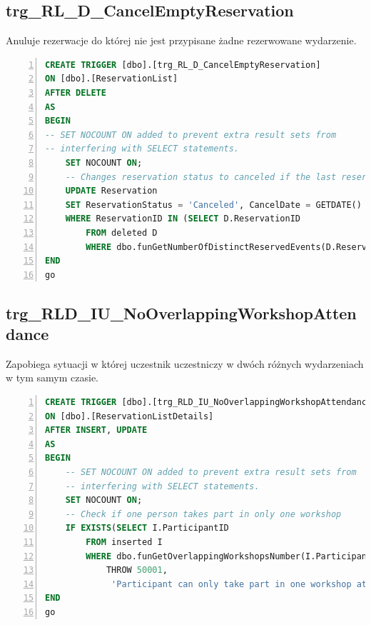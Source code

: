 \documentclass[]{article}
\begin{document}
	\subsection{trg\_RL\_D\_CancelEmptyReservation}
	Anuluje rezerwacje do której nie jest przypisane żadne rezerwowane wydarzenie.
\begin{lstlisting}[language=SQL,
showspaces=false,
basicstyle=\ttfamily,
numbers=left,
numberstyle=\tiny,
tabsize=2,
backgroundcolor=\color{lightg},
keywordstyle=\color{lightblue},
commentstyle=\color{gray}]
CREATE TRIGGER [dbo].[trg_RL_D_CancelEmptyReservation]
ON [dbo].[ReservationList]
AFTER DELETE
AS
BEGIN
-- SET NOCOUNT ON added to prevent extra result sets from
-- interfering with SELECT statements.
	SET NOCOUNT ON;
	-- Changes reservation status to canceled if the last reservation list was deleted
	UPDATE Reservation
	SET ReservationStatus = 'Canceled', CancelDate = GETDATE()
	WHERE ReservationID IN (SELECT D.ReservationID
		FROM deleted D
		WHERE dbo.funGetNumberOfDistinctReservedEvents(D.ReservationID) = 0)
END
go
\end{lstlisting}

	\subsection{trg\_RLD\_IU\_NoOverlappingWorkshopAttendance}
Zapobiega sytuacji w której uczestnik uczestniczy w dwóch różnych wydarzeniach w tym samym czasie.
\begin{lstlisting}[language=SQL,
showspaces=false,
basicstyle=\ttfamily,
numbers=left,
numberstyle=\tiny,
tabsize=2,
backgroundcolor=\color{lightg},
keywordstyle=\color{lightblue},
commentstyle=\color{gray}]
CREATE TRIGGER [dbo].[trg_RLD_IU_NoOverlappingWorkshopAttendance]
ON [dbo].[ReservationListDetails]
AFTER INSERT, UPDATE
AS
BEGIN
	-- SET NOCOUNT ON added to prevent extra result sets from
	-- interfering with SELECT statements.
	SET NOCOUNT ON;
	-- Check if one person takes part in only one workshop
	IF EXISTS(SELECT I.ParticipantID
		FROM inserted I
		WHERE dbo.funGetOverlappingWorkshopsNumber(I.ParticipantID) > 0)
			THROW 50001,
			 'Participant can only take part in one workshop at the same time.', 1
END
go

\end{lstlisting}
\end{document}

